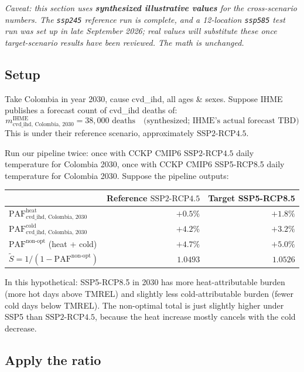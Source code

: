 \documentclass[11pt]{article}
\newcommand{\PAF}{\text{PAF}}
\newcommand{\SSPtwo}{\text{SSP2{-}RCP4.5}}
\newcommand{\mIHME}{m^{\text{IHME}}}
\begin{document}
\textit{Caveat: this section uses \textbf{synthesized illustrative
values} for the cross-scenario numbers. The \texttt{ssp245} reference run
is complete, and a 12-location \texttt{ssp585} test run was set up in late
September 2026; real values will substitute these once target-scenario
results have been reviewed. The math is unchanged.}

\subsection{Setup}

Take Colombia in year 2030, cause cvd\_ihd, all ages \& sexes. Suppose
IHME publishes a forecast count of cvd\_ihd deaths of:
\[
\mIHME_{\text{cvd\_ihd, Colombia, 2030}} = 38{,}000 \text{ deaths}
\quad \text{(synthesized; IHME's actual forecast TBD)}
\]
This is under their reference scenario, approximately $\SSPtwo$.

Run our pipeline twice: once with CCKP CMIP6 $\SSPtwo$ daily temperature
for Colombia 2030, once with CCKP CMIP6 SSP5-RCP8.5 daily temperature for
Colombia 2030. Suppose the pipeline outputs:

\begin{center}
\renewcommand{\arraystretch}{1.1}
\begin{tabular}{l r r}
\toprule
& Reference $\SSPtwo$ & Target SSP5-RCP8.5 \\
\midrule
$\PAF^{\text{heat}}_{\text{cvd\_ihd, Colombia, 2030}}$ & $+0.5\%$ & $+1.8\%$ \\
$\PAF^{\text{cold}}_{\text{cvd\_ihd, Colombia, 2030}}$ & $+4.2\%$ & $+3.2\%$ \\
$\PAF^{\text{non-opt}}$ (heat + cold)              & $+4.7\%$ & $+5.0\%$ \\
$\tilde S = 1/(1 - \PAF^{\text{non-opt}})$         & $1.0493$ & $1.0526$ \\
\bottomrule
\end{tabular}
\end{center}

In this hypothetical: SSP5-RCP8.5 in 2030 has more heat-attributable
burden (more hot days above TMREL) and slightly less cold-attributable
burden (fewer cold days below TMREL). The non-optimal total is just
slightly higher under SSP5 than $\SSPtwo$, because the heat increase mostly
cancels with the cold decrease.

\subsection{Apply the ratio}
\end{document}
